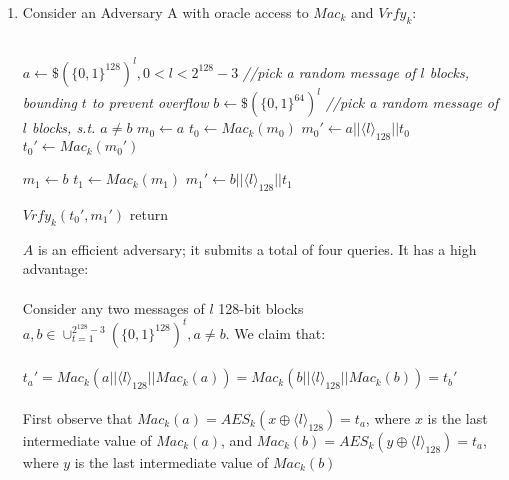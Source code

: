 \documentclass[]{article}
\begin{document}
\begin{enumerate}[label=(\alph*)]
	\item Consider an Adversary A with oracle access to $Mac_k$ and $Vrfy_k$:
	\\\\
	\begin{algorithm}[H]
		\SetAlgoLined
		$a \leftarrow\$ (\{0,1\}^{128})^l, 0 < l < 2^{128} - 3$ \emph{//pick a random message of $l$ blocks, bounding $t$ to prevent overflow}\;
		$b \leftarrow\$ (\{0,1\}^{64})^l$ \emph{//pick a random message of $l$ blocks, s.t. $a \neq  b$}\;\;
		$m_0 \leftarrow a$\;
		$t_0 \leftarrow Mac_k(m_0)$\;
		$m_0' \leftarrow a || \langle l \rangle_{128} || t_0$\;
		$t_0' \leftarrow Mac_k(m_0')$\;\;
		
		$m_1 \leftarrow b$\;
		$t_1 \leftarrow Mac_k(m_1)$\;
		$m_1' \leftarrow b || \langle l \rangle_{128} || t_1$\;\;
		
		$Vrfy_k(t_0', m_1')$\;
		return\;
		\caption{$A(Mac)$}
	\end{algorithm}

	$A$ is an efficient adversary; it submits a total of four queries. It has a high advantage:
	\\\\
	Consider any two messages of $l$ 128-bit blocks $a,b \in \cup^{2^{128} - 3}_{t = 1} (\{0,1\}^{128})^t, a \neq b$. We claim that:
	\\\\
	$t_a' = Mac_k(a || \langle l \rangle_{128} || Mac_k(a)) = Mac_k(b || \langle l \rangle_{128} || Mac_k(b)) = t_b'$
	\\\\
	First observe that $Mac_k(a) = AES_k(x \oplus \langle l \rangle_{128}) = t_a$, where $x$ is the last intermediate value of $Mac_k(a)$, and $Mac_k(b) = AES_k(y \oplus \langle l \rangle_{128}) = t_a$, where $y$ is the last intermediate value of $Mac_k(b)$
	

\end{enumerate}
\end{document}
